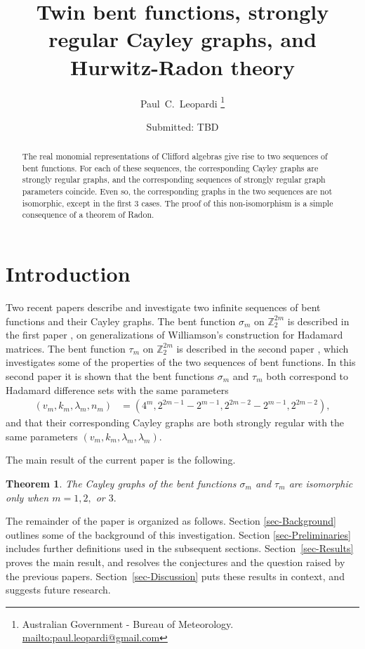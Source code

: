\documentclass[12pt,a4paper]{article}
\title{Twin bent functions, strongly regular Cayley graphs, and Hurwitz-Radon theory}
\author{
Paul~C.~Leopardi
\thanks{Australian Government - Bureau of Meteorology.
\protect\url{mailto:paul.leopardi@gmail.com}}
}
\date{Submitted: TBD}
\newcommand{\mb}[1]{\mathbb{#1}}
\newcommand{\Z}{\mb{Z}}
\newtheorem{Theorem}{Theorem}
\begin{document}
\maketitle

\begin{abstract}
%
The real monomial representations of Clifford algebras
give rise to two sequences of bent functions.
For each of these sequences, the corresponding Cayley graphs are 
strongly regular graphs, and the corresponding sequences of strongly regular graph parameters coincide.
Even so, the corresponding graphs in the two sequences are not isomorphic, except in the first 3 cases.
The proof of this non-isomorphism is a simple consequence of a theorem of Radon.  
%
\end{abstract}

\section{Introduction}
\label{sec-Introduction}
Two recent papers \cite{Leo14Constructions,Leo15Twin} describe and investigate two infinite sequences of bent functions and their Cayley graphs.
The bent function $\sigma_m$ on $\Z_2^{2 m}$ is described in the first paper \cite{Leo14Constructions}, on 
generalizations of Williamson's construction for Hada\-mard matrices.
The bent function $\tau_m$ on $\Z_2^{2 m}$ is described in the second paper \cite{Leo15Twin},
which investigates some of the properties of the two sequences of bent functions.
In this second paper it is shown that the bent functions $\sigma_m$ and $\tau_m$ both correspond to Hada\-mard difference sets with the same parameters
\begin{align*}
(v_m,k_m,\lambda_m,n_m) &= (4^m, 2^{2 m - 1} - 2^{m-1}, 2^{2 m - 2} - 2^{m-1}, 2^{2 m - 2}),
\end{align*}
and that their corresponding Cayley graphs are both strongly regular with the same parameters $(v_m,k_m,\lambda_m,\lambda_m)$.

The main result of the current paper is the following.
\begin{Theorem}\label{HR-non-imomorphic-theorem}
The Cayley graphs of the bent functions $\sigma_m$ and $\tau_m$ are isomorphic only when $m=1, 2,$ or $3.$ 
\end{Theorem}

The remainder of the paper is organized as follows.
Section \ref{sec-Background} outlines some of the background of this investigation.
Section \ref{sec-Preliminaries} includes further definitions used in the subsequent sections.
Section~\ref{sec-Results} proves the main result, and resolves the conjectures and the question raised by the previous papers.
Section~\ref{sec-Discussion} puts these results in context, and suggests future research.
\end{document}
